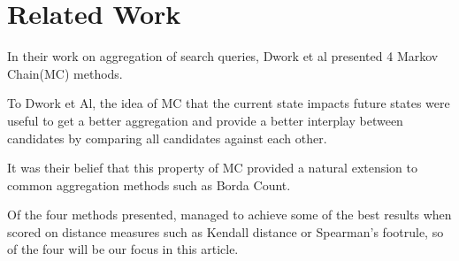 \section{Related Work}
In their work on aggregation of search queries, Dwork et al presented 4 Markov Chain(MC) methods.

To Dwork et Al, the idea of MC that the current state impacts future states were useful to get a better aggregation and provide a better interplay between candidates by comparing all candidates against each other. 

It was their belief that this property of MC provided a natural extension to common aggregation methods such as Borda Count.

Of the four methods presented, \MC managed to achieve some of the best results when scored on distance measures such as Kendall distance or Spearman's footrule, so of the four \MC will be our focus in this article.\cite{rank:aggregation}